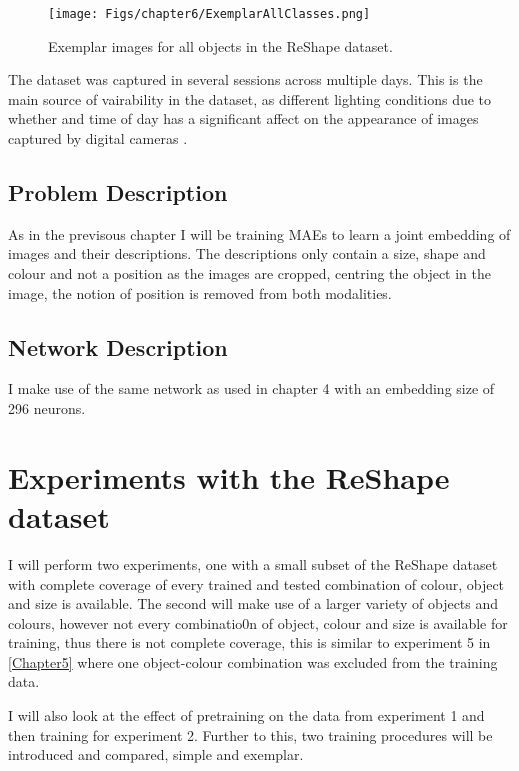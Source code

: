 \begin{figure}[h]
    \centering
    \texttt{[image: Figs/chapter6/ExemplarAllClasses.png]}
    \caption{Exemplar images for all objects in the ReShape dataset.}
    \label{fig:ReShapeAll}
\end{figure}

The dataset was captured in several sessions across multiple days. This is the main source of vairability in the dataset, as different lighting conditions due to whether and time of day has a significant affect on the appearance of images captured by digital cameras \cite{keller2016analysis, keller}.



\subsection{Problem Description}
As in the previsous chapter I will be training MAEs to learn a joint embedding of images and their descriptions. The descriptions only contain a size, shape and colour and not a position as the images are cropped, centring the object in the image, the notion of position is removed from both modalities.

\subsection{Network Description}
I make use of the same network as used in chapter 4 with an embedding size of 296 neurons. 

\section{Experiments with the ReShape dataset}
I will perform two experiments, one with a small subset of the ReShape dataset with complete coverage of every trained and tested combination of colour, object and size is available. The second will make use of a larger variety of objects and colours, however not every combinatio0n of object, colour and size is available for training, thus there is not complete coverage, this is similar to experiment 5 in \autoref{Chapter5} where one object-colour combination was excluded from the training data. 

I will also look at the effect of pretraining on the data from experiment 1 and then training for experiment 2. Further to this, two training procedures will be introduced and compared, simple and exemplar.

